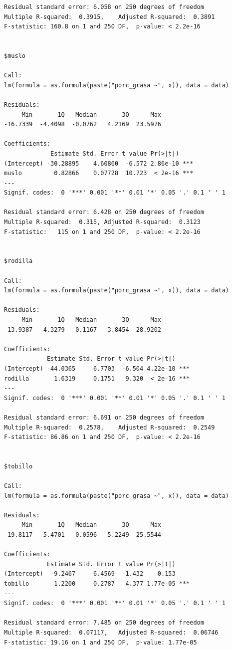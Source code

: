\documentclass[
  letterpaper,
  DIV=11,
  numbers=noendperiod]{scrartcl}
\begin{document}
\begin{verbatim}
Residual standard error: 6.058 on 250 degrees of freedom
Multiple R-squared:  0.3915,    Adjusted R-squared:  0.3891 
F-statistic: 160.8 on 1 and 250 DF,  p-value: < 2.2e-16


$muslo

Call:
lm(formula = as.formula(paste("porc_grasa ~", x)), data = data)

Residuals:
     Min       1Q   Median       3Q      Max 
-16.7339  -4.4098  -0.0762   4.2169  23.5976 

Coefficients:
             Estimate Std. Error t value Pr(>|t|)    
(Intercept) -30.28895    4.60860  -6.572 2.86e-10 ***
muslo         0.82866    0.07728  10.723  < 2e-16 ***
---
Signif. codes:  0 '***' 0.001 '**' 0.01 '*' 0.05 '.' 0.1 ' ' 1

Residual standard error: 6.428 on 250 degrees of freedom
Multiple R-squared:  0.315, Adjusted R-squared:  0.3123 
F-statistic:   115 on 1 and 250 DF,  p-value: < 2.2e-16


$rodilla

Call:
lm(formula = as.formula(paste("porc_grasa ~", x)), data = data)

Residuals:
     Min       1Q   Median       3Q      Max 
-13.9387  -4.3279  -0.1167   3.8454  28.9202 

Coefficients:
            Estimate Std. Error t value Pr(>|t|)    
(Intercept) -44.0365     6.7703  -6.504 4.22e-10 ***
rodilla       1.6319     0.1751   9.320  < 2e-16 ***
---
Signif. codes:  0 '***' 0.001 '**' 0.01 '*' 0.05 '.' 0.1 ' ' 1

Residual standard error: 6.691 on 250 degrees of freedom
Multiple R-squared:  0.2578,    Adjusted R-squared:  0.2549 
F-statistic: 86.86 on 1 and 250 DF,  p-value: < 2.2e-16


$tobillo

Call:
lm(formula = as.formula(paste("porc_grasa ~", x)), data = data)

Residuals:
     Min       1Q   Median       3Q      Max 
-19.8117  -5.4701  -0.0596   5.2249  25.5544 

Coefficients:
            Estimate Std. Error t value Pr(>|t|)    
(Intercept)  -9.2467     6.4569  -1.432    0.153    
tobillo       1.2200     0.2787   4.377 1.77e-05 ***
---
Signif. codes:  0 '***' 0.001 '**' 0.01 '*' 0.05 '.' 0.1 ' ' 1

Residual standard error: 7.485 on 250 degrees of freedom
Multiple R-squared:  0.07117,   Adjusted R-squared:  0.06746 
F-statistic: 19.16 on 1 and 250 DF,  p-value: 1.77e-05



\end{verbatim}
\end{document}
